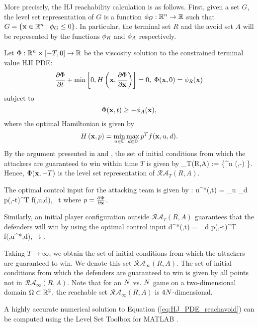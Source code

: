 More precisely, the HJ reachability calculation is as follows. 
First, given a set $G$, the level set representation of $G$ is a function $\phi_G:\mathbb{R}^n \rightarrow \mathbb{R}$ such that $G = \left\{\mathbf{x}\in\mathbb{R}^n \mid \phi_G\le0\right\}$.
In particular, the terminal set $R$ and the avoid set $A$ will be represented by the functions $\phi_R$ and $\phi_A$ respectively.

 
Let $\Phi:\mathbb{R}^n\times[-T,0]\rightarrow\mathbb{R}$ be the viscosity solution \cite{j:Crandall-TAMS-1983} to the constrained terminal value HJI PDE:
\begin{equation}
	\label{eq:HJ_PDE_reachavoid}
	\frac{\partial \Phi}{\partial t} + \min \left[0, H\left(\mathbf{x},\frac{\partial \Phi}{\partial \mathbf{x}}\right)\right] = 0,\;\Phi(\mathbf{x},0) = \phi_R(\mathbf{x})	 
\end{equation}
subject to 
$$\Phi(\mathbf{x},t) \geq -\phi_A(\mathbf{x}),$$
where the optimal Hamiltonian is given by
$$H\left(\mathbf{x},p\right) = \min_{u \in \mathbb{U}} \max_{d \in \mathbb{D}} p^T f(\mathbf{x},u,d).$$
By the argument presented in \cite{j:mitchell-TAC-2005} and \cite{mitchell-thesis}, the set of initial conditions from which the attackers are guaranteed to win within time $T$ is given by 
\bq
{}_T(R,A) := \left\{\xj\in \R^n \mid \Phi (\xj,-\T) \right\}.
\eq
Hence, $\Phi (\mathbf{x},-T)$ is the level set representation of $\mathcal{RA}_T(R,A)$.

The optimal control input for the attacking team is given by \cite{j:Lygeros-automatica-1999, j:Tomlin-ProcIEEE-2000, Huang2011}:
\bq \label{eq:opt_ctrl_u}
  u^*(\xj,t) = \arg \min_{u \in {}} \max_{d \in {}} p(\xj,-t)^T f(\xj,u,d), \!\ t \in [0,T] 
\eq
where $p = \frac{\partial \Phi}{\partial \mathbf{x}}$. 

Similarly, an initial player configuration outside $\mathcal{RA}_T(R,A)$ guarantees that the defenders will win by using the optimal control input
\bq \label{eq:opt_ctrl_d}
  d^*(\xj,t) = \arg \max_{d \in {}} p(\xj,-t)^T f(\xj,u^*,d), \ t \in [0,T].
\eq

Taking $T\rightarrow\infty$, we obtain the set of initial conditions from which the attackers are guaranteed to win. We denote this set $\mathcal{RA}_\infty(R,A)$. The set of initial conditions from which the defenders are guaranteed to win is given by all points not in $\mathcal{RA}_\infty(R,A)$. Note that for an $N$ vs. $N$ game on a two-dimensional domain $\Omega\subset\mathbb{R}^2$, the reachable set $\mathcal{RA}_\infty(R,A)$ is $4N$-dimensional.

A highly accurate numerical solution to Equation (\ref{eq:HJ_PDE_reachavoid}) can be computed using the Level Set Toolbox for MATLAB \cite{LSToolbox}.

